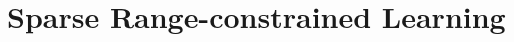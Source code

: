 \documentclass[journal]{IEEEtran}
\begin{document}





\section{Sparse Range-constrained Learning}\label{SRL}


\end{document}
